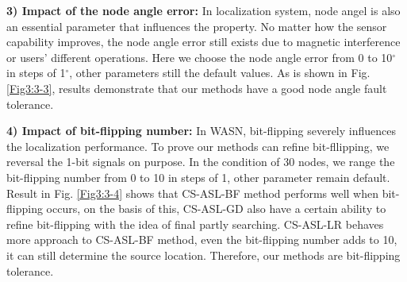 \textbf{3) Impact of the node angle error:}
In localization system, node angel is also an essential parameter that influences the property. No matter how the sensor capability improves, the node angle error still exists due to magnetic interference or users' different operations. Here we choose the node angle error from 0 to 10$^{\circ} $ in steps of 1$^{\circ} $, other parameters still the default values.
As is shown in Fig. \ref{Fig3:3-3}, results demonstrate that our methods have a good node angle fault tolerance.

\textbf{4) Impact of bit-flipping number:}
In WASN, bit-flipping severely influences the localization performance. To prove our methods can  refine bit-fllipping, we reversal the 1-bit signals on purpose. In the condition of 30 nodes, we range the bit-flipping number from 0 to 10 in steps of 1, other parameter remain default. Result in Fig. \ref{Fig3:3-4} shows that CS-ASL-BF method performs well when bit-flipping occurs, on the basis of this,  CS-ASL-GD also have a certain ability to refine bit-flipping with the idea of final partly searching.
CS-ASL-LR behaves more approach to CS-ASL-BF method, even the bit-flipping number adds to 10, it can still determine the source location. Therefore, our methods are bit-flipping tolerance.

		



